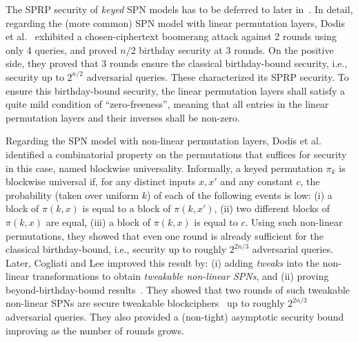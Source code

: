 The SPRP security of {\it keyed} SPN models has to be deferred to later in~\cite{EPRINT:DKSTZ17,C:CDKLST18}. In detail, regarding the (more common) SPN model with linear permutation layers, Dodis et al.~\cite{EPRINT:DKSTZ17} exhibited a chosen-ciphertext boomerang attack against 2 rounds using only 4 queries, and proved $n/2$ birthday security at 3 rounds. On the positive side, they proved that 3 rounds ensure the classical birthday-bound security, i.e., security up to $2^{n/2}$ adversarial queries. These characterized its SPRP security. To ensure this birthday-bound security, the linear permutation layers shall satisfy a quite mild condition of ``zero-freeness'', meaning that all entries in the linear permutation layers and their inverses shall be non-zero.



Regarding the SPN model with non-linear permutation layers, Dodis et al.~\cite{EPRINT:DKSTZ17} identified a combinatorial property on the permutations that suffices for security in this case, named blockwise universality. Informally, a keyed permutation $\pi_k$ is blockwise universal if, for any distinct inputs $x,x'$ and any constant $c$, the probability (taken over uniform $k$) of each of the following events is low: (i) a block of $\pi(k,x)$ is equal to a block of $\pi(k,x')$, (ii) two different blocks of $\pi(k,x)$ are equal, (iii) a block of $\pi(k,x)$ is equal to $c$. Using such non-linear permutations, they showed that even one round is already sufficient for the classical birthday-bound, i.e., security up to roughly $2^{2n/3}$ adversarial queries. Later, Cogliati and Lee improved this result by: (i) adding {\it tweaks} into the non-linear transformations
to obtain {\it tweakable non-linear SPNs}, and (ii) proving beyond-birthday-bound results~\cite{EPRINT:DKSSZZ18}. They showed that two rounds of such tweakable non-linear SPNs are secure tweakable blockciphers~\cite{JC:LisRivWag11} up to roughly $2^{2n/3}$ adversarial queries. They also provided a (non-tight) asymptotic security bound improving as the number of rounds grows.


